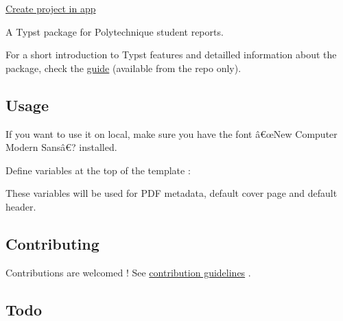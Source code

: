 \href{/app?template=typographix-polytechnique-reports&version=0.1.4}{Create
project in app}

\label{readme}
A Typst package for Polytechnique student reports.

For a short introduction to Typst features and detailled information
about the package, check the
\href{https://github.com/remigerme/typst-polytechnique/blob/main/guide.pdf}{guide}
(available from the repo only).

\subsection{Usage}\label{usage}

If you want to use it on local, make sure you have the font â€œNew
Computer Modern Sansâ€? installed.

Define variables at the top of the template :

\begin{Shaded}
\begin{Highlighting}[]

\end{Highlighting}
\end{Shaded}

These variables will be used for PDF metadata, default cover page and
default header.

\subsection{Contributing}\label{contributing}

Contributions are welcomed ! See
\href{https://github.com/typst/packages/raw/main/packages/preview/typographix-polytechnique-reports/0.1.4/CONTRIBUTING.md}{contribution
guidelines} .

\subsection{Todo}\label{todo}

